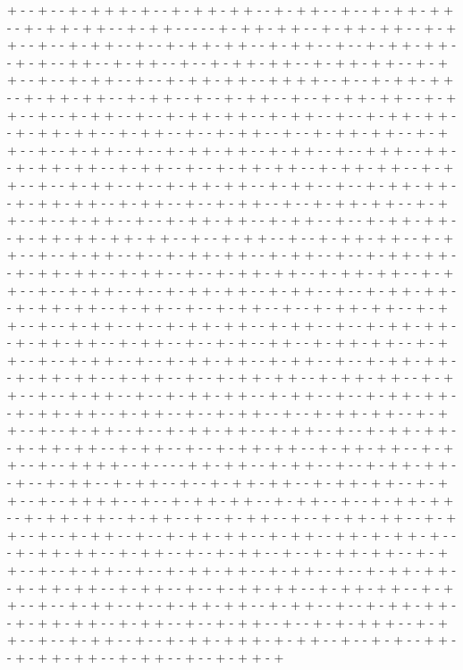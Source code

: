 + - - + - - + - + + + - + - - + - + + - + + - - + - + + - - + - - + - + + - + + - - + - + + - + + - - + - + + - - - - - + - + + - + + - - + - + + - + + - - + - + + - - 
+ - - + - + + - - + - - + - + + - + + - - + - + + - - + - - + - + + - + + - - + - + - - + + - - + - + + - - + - - + - + + - + + - - + - + + - + + - - + - + + - - + - - + - + + - - + - - + - + + - + + - - + + + + - - + - - + - + + - + + - - + - + + - + + - - + - + + - - + - - + - + + - - + - - + - + + - + + - - + - + + - - + - - + - + + - - + - - + - + + - + + - - + - + + - - + - - + - + + - + + - - + - + + - + + - - + - + + - - + - - + - + + - - + - - + - + + - + + - - + - + + - - + - - + - + + - - + - - + - + + - + + - - + - + + - - + - - + + + - - + + - - + - + + - + + - - + - + + - - + - - + - + + - + + - - + - + + - + + - - + - + + - - + - - + - + + - - + - - + - + + - + + - - + - + + - - + - - + - + + - + + - - + - + + - + + - - + - + + - - + - - + - + + - - + - - + - + + - + + - - + - + + - - + - - + - + + - - + - - + - + + - + + - - + - + + - - + - - + - + + - + + - - + - + + - + + - + + - + + - - + - - + - + + - - + - - + - + + - + + - - + - + + - - + - - + - + + - - + - - + - + + - + + - - + - + + - - + - - + - + + - + + - - + - + + - + + - - + - + + - - + - - + - + + - + + - - + - + + - + + - - + - + + - - + - - + - + + - - + - - + - + + - + + - - + - + + - - + - - + - + + - + + - - + - + + - + + - - + - + + - - + - - + - + + - - + - - + - + + - + + - - + - + + - - + - - + - + + - - + - - + - + + - + + - - + - + + - - + - - + - + + - + + - - + - + + - + + - - + - + + - - + - - + - + - - + + - - + - + + - + + - - + - + + - - + - - + - + + - - + - - + - + + - + + - - + - + + - - + - - + - + + - + + - - + - + + - + + - - + - + + - - + - - + - + + - + + - - + - + + - + + - - + - + + - - + - - + - + + - - + - - + - + + - + + - - + - + + - - + - - + - + + - + + - - + - + + - + + - - + - + + - - + - - + - + + - - + - - + - + + - + + - - + - + + - - + - - + - + + - - + - - + - + + - + + - - + - + + - - + - - + - + + - + + - - + - + + - + + - - + - + + - - + - - + - + + - + + - - + - + + - + + - - + - + + - - + - - + + + + - - + - - - - + + - + + - - + - + + - - + - - + - + + - + + - - + - - + - + + - - + - + + - - + - - + - + + - + + - - + - + + - + + - - + - + + - - + - - + + + + - - + - - + - + + - + + - - + - + + - - + - - + - + + - + + - - + - + + - + + - - + - + + - - + - - + - + + - - + - - + - + + - + + - - + - + + - - + - - + - + + - - + - - + - + + - + + - - + - + + - - + + - + - + + - + - - - + - + + - + + - - + - + + - - + - - + - + + - - + - - + - + + - + + - - + - + + - - + - - + - + + - - + - - + - + + - + + - - + - + + - - + - - + - + + - + + - - + - + + - + + - - + - + + - - + - - + - + + - + + - - + - + + - + + - - + - + + - - + - - + - + + - - + - - + - + + - + + - - + - + + - - + - - + - + + - + + - - + - + + - + + - - + - + + - - + - - + - + + - - + - - + - + - + + + - - + - + + - - + - - + - + + - - + - - + - + + - + + + - + - + + - - + - - + - + - - + + - - + - + + - + + - - + - + + - - + - - + - + + - + 

